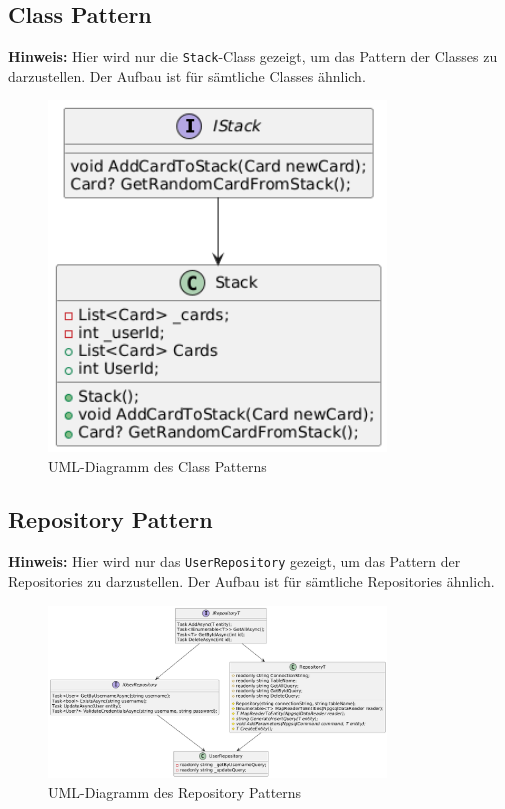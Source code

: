 \documentclass[a4paper, 12pt]{article}
\begin{document}
\subsection {Class Pattern}
\noindent\textbf{Hinweis:} Hier wird nur die \texttt{Stack}-Class gezeigt, um das Pattern der Classes zu darzustellen. Der Aufbau ist für sämtliche Classes ähnlich.
\begin{figure}[h!]
\centering
\includegraphics[width=0.8\textwidth]{Class_UML_Example_Stack.png}
\caption{UML-Diagramm des Class Patterns}
\label{fig:repository_pattern}
\end{figure}
\pagebreak

\subsection {Repository Pattern}
\noindent\textbf{Hinweis:} Hier wird nur das \texttt{UserRepository} gezeigt, um das Pattern der Repositories zu darzustellen. Der Aufbau ist für sämtliche Repositories ähnlich.
\begin{figure}[h!]
\centering
\includegraphics[width=0.8\textwidth]{Repository_UML_Example_User.png}
\caption{UML-Diagramm des Repository Patterns}
\label{fig:repository_pattern}
\end{figure}
\pagebreak
\end{document}
